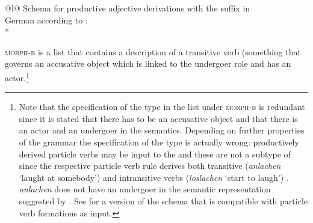 \documentclass[output=paper]{langsci/langscibook}
\begin{document}
\begin{tabular}[t]{@{}l@{}}
Schema for productive adjective derivations with the suffix  in\\ German according to
\citet[]{Riehemann98a}:\\*
\end{tabular}
\z
\textsc{morph-b} is a list that contains a description of a transitive verb (something that governs
an accusative object which is linked to the undergoer role  and has an actor.\footnote{
  Note that the specification of the type  in the list under \textsc{morph-b} is
  redundant since it is stated that there has to be an accusative object and that there is an actor
  and an undergoer in the semantics. Depending on further properties of the grammar the
  specification of the type is actually wrong: productively derived particle verbs may be input to
  the \bard and these are not a subtype of  since the respective particle verb rule
  derives both transitive (\emph{anlachen} `laught at somebody')  and intransitive verbs
  (\emph{loslachen} `start to laugh') \citep[]{Mueller2003a}. \emph{anlachen} does not have an
  undergoer in the semantic representation suggested by \citet{Stiebels96a}. See
  \citet[]{Mueller2003a} for a version of the \bard schema that is compatible with particle verb
  formations as input.
}
\end{document}
